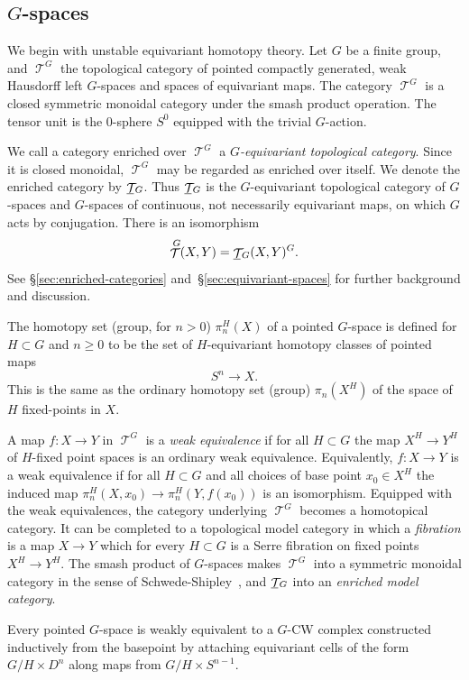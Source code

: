 \documentclass{amsart}
\theoremstyle{definition}
\theoremstyle{remark}
\DeclareMathOperator{\spaces}{\mathcal T}
\newcommand{\gspaces}[1]{\underline{\spaces\mkern-4mu}\mkern4mu_{\!#1}}
\newcommand{\ugspaces}[1]{\spaces^{#1}}
\begin{document}
\subsection{$G$-spaces} 
\label{sec:g-spaces} 

We begin with unstable equivariant homotopy theory.  Let $G$ be a
finite group, and $\ugspaces{G}$ the topological category of pointed
compactly generated, weak Hausdorff left $G$-spaces and spaces of
equivariant maps.  The category $\ugspaces{G}$ is a closed symmetric
monoidal category under the smash product operation.  The tensor unit
is the $0$-sphere $S^{0}$ equipped with the trivial $G$-action.

We call a category enriched over $\ugspaces{G}$ a {\em $G$-equivariant
topological category}.  Since it is closed monoidal, $\ugspaces{G}$
may be regarded as enriched over itself.  We denote the enriched
category by $\gspaces{G}$.  Thus $\gspaces{G}$ is the $G$-equivariant
topological category of $G$-spaces and $G$-spaces of continuous, not
necessarily equivariant maps, on which $G$ acts by conjugation.  There
is an isomorphism
\[
\ugspaces{G}(X,Y)=\gspaces{G}(X,Y)^{G}.
\]
See \S\ref{sec:enriched-categories} and~\S\ref{sec:equivariant-spaces}
for further background and discussion.  


The homotopy set (group, for $n>0$) $\pi^{H}_{n}(X)$ of a pointed
$G$-space is defined for $H\subset G$ and $n\ge 0$ to be the set of
$H$-equivariant homotopy classes of pointed maps
\[
S^{n}\to X.
\]
This is the same as the ordinary homotopy set (group) $\pi_{n}(X^{H})$
of the space of $H$ fixed-points in $X$.

A map $f:X\to Y$ in $\ugspaces{G}$ is a {\em weak equivalence} if for
all $H\subset G$ the map $X^{H}\to Y^{H}$ of $H$-fixed point spaces is
an ordinary weak equivalence.  Equivalently, $f:X\to Y$ is a weak
equivalence if for all $H\subset G$ and all choices of base point
$x_{0}\in X^{H}$ the induced map $\pi^{H}_{n}(X,x_{0})\to
\pi^{H}_{n}(Y,f(x_{0}))$ is an isomorphism.  Equipped with the weak
equivalences, the category underlying $\ugspaces{G}$ becomes a
homotopical category.  It can be completed to a topological model
category in which a {\em fibration} is a map $X\to Y$ which for every
$H\subset G$ is a Serre fibration on fixed points $X^{H}\to Y^{H}$.
The smash product of $G$-spaces makes $\ugspaces{G}$ into a symmetric
monoidal category in the sense of Schwede-Shipley~\cite[Definition
3.1]{MR1997322}, and $\gspaces{G}$ into an {\em enriched model
category}.

Every pointed $G$-space is weakly equivalent to a $G$-CW complex
constructed inductively from the basepoint by attaching equivariant
cells of the form $G/H\times D^{n}$ along maps from $G/H \times
S^{n-1}$.
\end{document}
